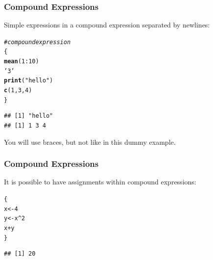 \documentclass[12pt]{beamer}\usepackage[]{graphicx}\usepackage[]{color}
\makeatletter
\newcommand{\hlnum}[1]{\textcolor[rgb]{0.686,0.059,0.569}{#1}}%
\newcommand{\hlstr}[1]{\textcolor[rgb]{0.192,0.494,0.8}{#1}}%
\newcommand{\hlcom}[1]{\textcolor[rgb]{0.678,0.584,0.686}{\textit{#1}}}%
\newcommand{\hlopt}[1]{\textcolor[rgb]{0,0,0}{#1}}%
\newcommand{\hlstd}[1]{\textcolor[rgb]{0.345,0.345,0.345}{#1}}%
\newcommand{\hlkwb}[1]{\textcolor[rgb]{0.69,0.353,0.396}{#1}}%
\newcommand{\hlkwd}[1]{\textcolor[rgb]{0.737,0.353,0.396}{\textbf{#1}}}%
\newenvironment{kframe}{%
 \def\at@end@of@kframe{}%
 \ifinner\ifhmode%
  \def\at@end@of@kframe{\end{minipage}}%
  \begin{minipage}{\columnwidth}%
 \fi\fi%
 \def\FrameCommand##1{\hskip\@totalleftmargin \hskip-\fboxsep
 \colorbox{shadecolor}{##1}\hskip-\fboxsep
     \hskip-\linewidth \hskip-\@totalleftmargin \hskip\columnwidth}%
 \MakeFramed {\advance\hsize-\width
   \@totalleftmargin\z@ \linewidth\hsize
   \@setminipage}}%
 {\par\unskip\endMakeFramed%
 \at@end@of@kframe}
\newenvironment{knitrout}{}{} %
\makeatother
\begin{document}

\begin{frame}[fragile]
\frametitle{Compound Expressions}

Simple expressions in a compound expression separated by newlines:
\begin{knitrout}\footnotesize
{}\color{fgcolor}\begin{kframe}
\begin{alltt}
\hlcom{# compound expression}
\hlstd{\{}
  \hlkwd{mean}\hlstd{(}\hlnum{1}\hlopt{:}\hlnum{10}\hlstd{)}
  \hlstr{'3'}
  \hlkwd{print}\hlstd{(}\hlstr{"hello"}\hlstd{)}
  \hlkwd{c}\hlstd{(}\hlnum{1}\hlstd{,} \hlnum{3}\hlstd{,} \hlnum{4}\hlstd{)}
\hlstd{\}}
\end{alltt}
\begin{verbatim}
## [1] "hello"
## [1] 1 3 4
\end{verbatim}
\end{kframe}
\end{knitrout}

You will use braces, but not like in this dummy example.

\end{frame}


\begin{frame}[fragile]
\frametitle{Compound Expressions}

It is possible to have assignments within compound expressions:
\begin{knitrout}\footnotesize
{}\color{fgcolor}\begin{kframe}
\begin{alltt}
\hlstd{\{}
  \hlstd{x} \hlkwb{<-} \hlnum{4}
  \hlstd{y} \hlkwb{<-} \hlstd{x}\hlopt{^}\hlnum{2}
  \hlstd{x} \hlopt{+} \hlstd{y}
\hlstd{\}}
\end{alltt}
\begin{verbatim}
## [1] 20
\end{verbatim}
\end{kframe}
\end{knitrout}

\end{frame}

\end{document}
